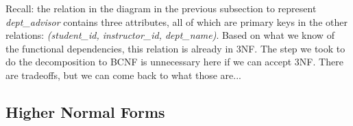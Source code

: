 Recall: the relation in the diagram in the previous subsection to represent \textit{dept\_advisor} contains three attributes, all of which are primary keys in the other relations: \textit{(student\_id, instructor\_id, dept\_name)}. Based on what we know of the functional dependencies, this relation is already in 3NF. The step we took to do the decomposition to BCNF is unnecessary here if we can accept 3NF. There are tradeoffs, but we can come back to what those are...

\subsection*{Higher Normal Forms}




